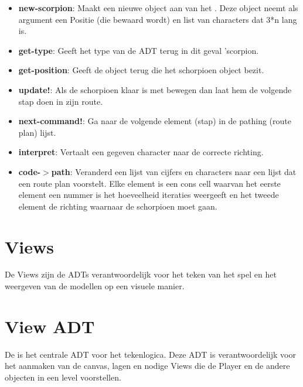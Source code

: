 \begin{itemize}
	\item \textbf{new-scorpion}: Maakt een nieuwe object aan van het \texttt{}.
		Deze object neemt als argument een Positie (die bewaard wordt)
		en list van characters dat 3*n lang is.
	\item \textbf{get-type}: Geeft het type van de ADT terug in dit geval 'scorpion.
	\item \textbf{get-position}: Geeft de \texttt{} object terug die het schorpioen object bezit.
	\item \textbf{update!}: Als de schorpioen klaar is met bewegen dan laat hem de volgende stap doen in zijn route.
	\item \textbf{next-command!}: Ga naar de volgende element (stap) in de pathing (route plan) lijst.
	\item \textbf{interpret}: Vertaalt een gegeven character naar de correcte richting.
	\item \textbf{code-$>$path}: Veranderd een lijst van cijfers en characters naar een lijst dat een route plan voorstelt.
		Elke element is een cons cell 
		waarvan het eerste element een nummer is het hoeveelheid iteraties weergeeft
		en het tweede element de richting waarnaar de schorpioen moet gaan.
\end{itemize}

\section{Views}
\label{view}
De Views zijn de ADTs verantwoordelijk voor het teken van het spel en het weergeven van de modellen op een visuele manier.

\section{View ADT}
\label{section:view}
De \texttt{} is het centrale ADT voor het tekenlogica.
Deze ADT is verantwoordelijk voor het aanmaken van de canvas, lagen en nodige Views die de Player en de andere objecten in een level voorstellen.

